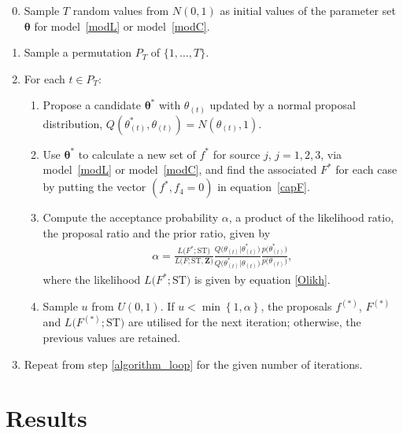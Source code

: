 \documentclass[AMA,STIX1COL]{WileyNJD-v2}
\begin{document}
\begin{enumerate}
\setcounter{enumi}{-1}
\item Sample $T$ random values from $N(0,1)$ as initial values of the parameter set $\boldsymbol{\theta}$ for model~\eqref{modL} or model~\eqref{modC}.
\item Sample a permutation $P_T$ of $\{1, \ldots, T\}$.\label{algorithm_loop}
\item For each $t \in P_T$:
\begin{enumerate}
\item Propose a candidate $\boldsymbol{\theta}^*$ with $\theta_{(t)}$ updated by a normal proposal distribution, $Q(\theta_{(t)}^*, \theta_{(t)}) = N(\theta_{(t)}, 1)$.

\item Use $\boldsymbol{\theta}^*$ to calculate a new set of $f^*$ for source $j$, $j=1, 2, 3$, via model~\eqref{modL} or model~\eqref{modC}, and find the associated $F^*$ for each case by putting the vector $(f^*, f_4=0)$ in equation~\eqref{capF}.

\item Compute the acceptance probability $\alpha$, a product of the likelihood ratio, the proposal ratio and the prior ratio, given by
\begin{align*}
\alpha=\frac{L\Big(F^*; \text{ST}\Big)}{L\Big(F; \text{ST}, \boldsymbol{Z}\Big)}\frac{Q\Big(\theta_{(t)} \vert \theta_{(t)}^*\Big)}{Q\Big(\theta_{(t)}^* \vert \theta_{(t)}\Big)}\frac{p\Big(\theta_{(t)}^*\Big)}{p\Big(\theta_{(t)}\Big)},
\end{align*}
where the likelihood $L\Big(F^*; \text{ST})$ is given by equation \eqref{Olikh}. \item Sample $u$ from $U(0,1)$. If $u < \min \left\{1, \alpha \right\}$, the proposals $f^{(*)}$, $F^{(*)}$ and $L\Big(F^{(*)}; \text{ST}\Big)$ are utilised for the next iteration; otherwise, the previous values are retained.
\end{enumerate}
\item Repeat from step \ref{algorithm_loop} for the given number of iterations.

\end{enumerate}

\section{Results}
\end{document}
